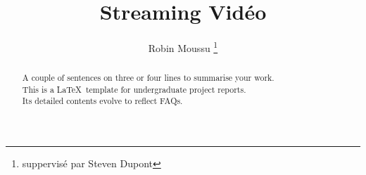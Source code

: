 \documentclass[a4paper,11pt]{custom}
\begin{document}
\title{
  Streaming Vidéo
}
\author{
  Robin Moussu
  \thanks{
    suppervisé par Steven Dupont
  }
}
\maketitle
\begin{abstract}\centering
A couple of sentences on three or four lines to summarise your work.\\ 
This is a \LaTeX\ template for undergraduate project reports.\\
Its detailed contents evolve to reflect FAQs.
\end{abstract}
\tableofcontents





\appendix





\end{document}
